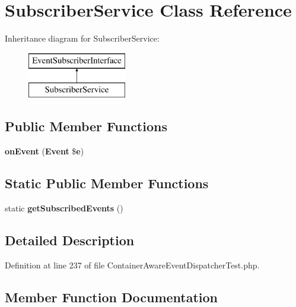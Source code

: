 \section{Subscriber\+Service Class Reference}
\label{class_symfony_1_1_component_1_1_event_dispatcher_1_1_tests_1_1_subscriber_service}
Inheritance diagram for Subscriber\+Service\+:\begin{figure}[H]
\begin{center}
\leavevmode
\includegraphics[height=2.000000cm]{class_symfony_1_1_component_1_1_event_dispatcher_1_1_tests_1_1_subscriber_service}
\end{center}
\end{figure}
\subsection*{Public Member Functions}
\begin{DoxyCompactItemize}
\item 
{\bf on\+Event} ({\bf Event} \${\bf e})
\end{DoxyCompactItemize}
\subsection*{Static Public Member Functions}
\begin{DoxyCompactItemize}
\item 
static {\bf get\+Subscribed\+Events} ()
\end{DoxyCompactItemize}


\subsection{Detailed Description}


Definition at line 237 of file Container\+Aware\+Event\+Dispatcher\+Test.\+php.



\subsection{Member Function Documentation}
